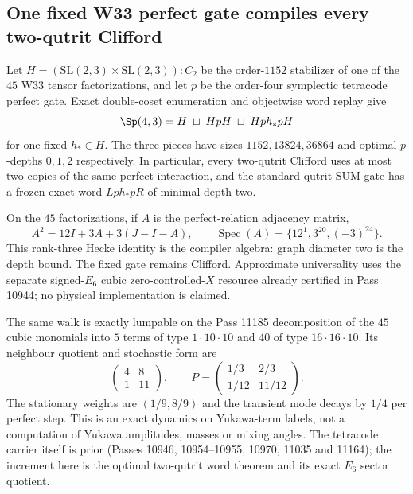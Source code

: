 \subsection*{One fixed W33 perfect gate compiles every two-qutrit Clifford}

Let $H=(\mathrm{SL}(2,3)\times\mathrm{SL}(2,3)){:}C_2$ be the order-$1152$
stabilizer of one of the $45$ W33 tensor factorizations, and let $p$ be the
order-four symplectic tetracode perfect gate. Exact double-coset enumeration
and objectwise word replay give
\[
 \Sp(4,3)=H\;\sqcup\;HpH\;\sqcup\;Hp h_*pH
\]
for one fixed $h_*\in H$. The three pieces have sizes
$1152,13824,36864$ and optimal $p$-depths $0,1,2$ respectively. In
particular, every two-qutrit Clifford uses at most two copies of the same
perfect interaction, and the standard qutrit SUM gate has a frozen exact word
$Lph_*pR$ of minimal depth two.

On the $45$ factorizations, if $A$ is the perfect-relation adjacency matrix,
\[
 A^2=12I+3A+3(J-I-A),\qquad
 \operatorname{Spec}(A)=\{12^1,3^{20},(-3)^{24}\}.
\]
This rank-three Hecke identity is the compiler algebra: graph diameter two is
the depth bound. The fixed gate remains Clifford. Approximate universality
uses the separate signed-$E_6$ cubic zero-controlled-$X$ resource already
certified in Pass 10944; no physical implementation is claimed.

The same walk is exactly lumpable on the Pass 11185 decomposition of the
$45$ cubic monomials into $5$ terms of type $1\cdot10\cdot10$ and $40$ of
type $16\cdot16\cdot10$.  Its neighbour quotient and stochastic form are
\[
 \begin{pmatrix}4&8\\1&11\end{pmatrix},\qquad
 P=\begin{pmatrix}1/3&2/3\\1/12&11/12\end{pmatrix}.
\]
The stationary weights are $(1/9,8/9)$ and the transient mode decays by
$1/4$ per perfect step.  This is an exact dynamics on Yukawa-term labels,
not a computation of Yukawa amplitudes, masses or mixing angles.
The tetracode carrier itself is prior (Passes 10946, 10954--10955, 10970,
11035 and 11164); the increment here is the optimal two-qutrit word theorem
and its exact $E_6$ sector quotient.
